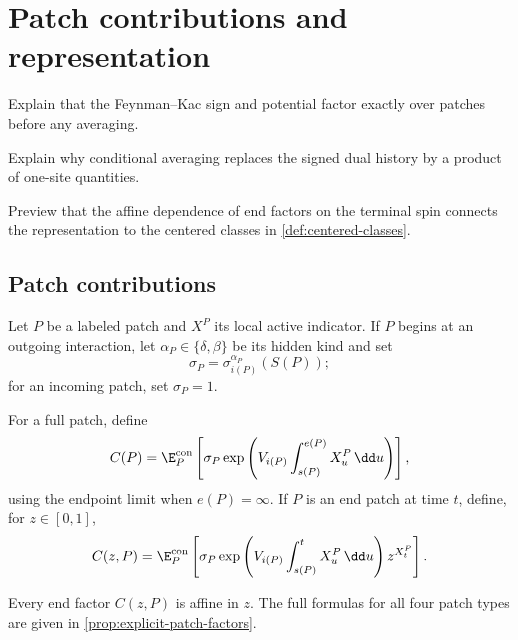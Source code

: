 \section{Patch contributions and representation}
\label{sec:representation}

\begin{discussion}
  \item Explain that the Feynman--Kac sign and potential factor exactly
  over patches before any averaging.
  \item Explain why conditional averaging replaces the signed dual
  history by a product of one-site quantities.
  \item Preview that the affine dependence of end factors on the
  terminal spin connects the representation to the centered classes
  in \cref{def:centered-classes}.
\end{discussion}

\subsection{Patch contributions}

\begin{definition}
\label{def:patch-contribution}
Let \(P\) be a labeled patch and \(X^P\) its local active indicator. If
\(P\) begins at an outgoing interaction, let
\(\alpha_P\in\{\delta,\beta\}\) be its hidden kind and set
\[
  \sigma_P=\sigma_{i(P)}^{\alpha_P}(S(P));
\]
for an incoming patch, set \(\sigma_P=1\).

For a full patch, define
\begin{equation}
  C(P)
  =
  \E_P^{\mathrm{con}}\left[
    \sigma_P
    \exp\left(
      V_{i(P)}
      \int_{s(P)}^{e(P)}X_u^P\,\dd u
    \right)
  \right],
  \label{eq:full-contribution}
\end{equation}
using the endpoint limit when \(e(P)=\infty\). If \(P\) is an end
patch at time \(t\), define, for \(z\in[0,1]\),
\begin{equation}
  C(z,P)
  =
  \E_P^{\mathrm{con}}\left[
    \sigma_P
    \exp\left(
      V_{i(P)}
      \int_{s(P)}^tX_u^P\,\dd u
    \right)
    z^{X_t^P}
  \right].
  \label{eq:end-contribution}
\end{equation}
\end{definition}

\begin{proposition}
\label{prop:affine-end-factors}
Every end factor \(C(z,P)\) is affine in \(z\). The full formulas for
all four patch types are given in
\cref{prop:explicit-patch-factors}.
\end{proposition}

